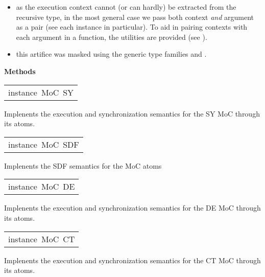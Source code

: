 \begin{haddockdesc}
\begin{itemize}
\item
as the execution context cannot (or can hardly) be extracted from
 the recursive type, in the most general case we pass both context
 \emph{and} argument as a pair (see each instance in particular). To aid
 in pairing contexts with each argument in a function, the 
 utilities are provided (see ).\par

\item
this artifice was masked using the generic type families 
 and . \par

\end{itemize}

\haddockpremethods{}\textbf{Methods}
\end{haddockdesc}
\begin{haddockdesc}
\item[\begin{tabular}{@{}l}
instance\ MoC\ SY
\end{tabular}]\haddockbegindoc
Implenents the execution and synchronization semantics for the SY
 MoC through its atoms.\par

\end{haddockdesc}
\begin{haddockdesc}
\item[\begin{tabular}{@{}l}
instance\ MoC\ SDF
\end{tabular}]\haddockbegindoc
Implenents the SDF semantics for the MoC atoms\par

\end{haddockdesc}
\begin{haddockdesc}
\item[\begin{tabular}{@{}l}
instance\ MoC\ DE
\end{tabular}]\haddockbegindoc
Implenents the execution and synchronization semantics for the DE
 MoC through its atoms.\par

\end{haddockdesc}
\begin{haddockdesc}
\item[\begin{tabular}{@{}l}
instance\ MoC\ CT
\end{tabular}]\haddockbegindoc
Implenents the execution and synchronization semantics for the CT
 MoC through its atoms.\par

\end{haddockdesc}
